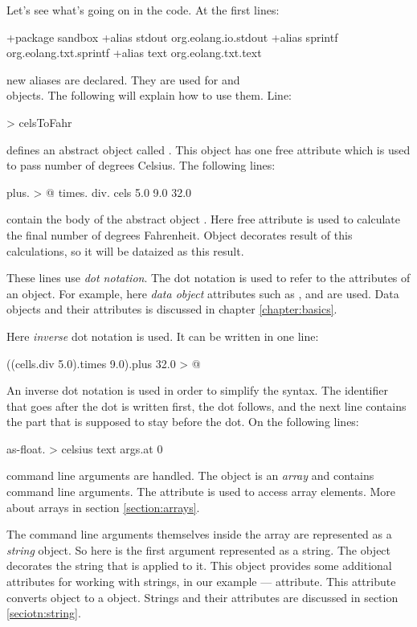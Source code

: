 \documentclass[12pt]{book}
\begin{document}
Let's see what's going on in the code. At the first lines:
\begin{ffcode}
+package sandbox
+alias stdout org.eolang.io.stdout
+alias sprintf org.eolang.txt.sprintf
+alias text org.eolang.txt.text
\end{ffcode}
new aliases are declared. They are used for  and 
\\
 objects. The following will explain how to use them. Line:
\begin{ffcode}
[cels] > celsToFahr
\end{ffcode}
defines an abstract object called . This object has one free attribute  which is used to pass number of degrees Celsius. The following lines:
\begin{ffcode}
plus. > @
  times.
    div.
      cels
      5.0
    9.0
  32.0
\end{ffcode}
contain the body of the abstract object . Here  free attribute is used to calculate the final number of degrees Fahrenheit. Object  decorates result of this calculations, so it will be dataized as this result.

These lines use \textit{dot notation}. The dot notation is used to refer to the attributes of an object. For example, here  \textit{data object} attributes such as ,  and  are used. Data objects and their attributes is discussed in chapter \ref{chapter:basics}. 

Here \textit{inverse} dot notation is used. It can be written in one line:
\begin{ffcode}
((cells.div 5.0).times 9.0).plus 32.0 > @
\end{ffcode}
An inverse dot notation is used in order to simplify the syntax. The identiﬁer that goes after the dot is written ﬁrst, the dot follows, and the next line contains the part that is supposed to stay before the dot.  On the following lines:
\begin{ffcode}
as-float. > celsius
  text
    args.at 0
\end{ffcode}
command line arguments are handled.  The  object is an \textit{array} and contains command line arguments. The attribute  is used to access array elements. More about arrays in section \ref{section:arrays}.

The command line arguments themselves inside the  array are represented as a \textit{string} object.  So here  is the first argument represented as a string. The object  decorates the string that is applied to it. This object provides some additional attributes for working with strings, in our example —  attribute. This attribute converts  object to a  object. Strings and their attributes are discussed in section \ref{seciotn:string}.
\end{document}
